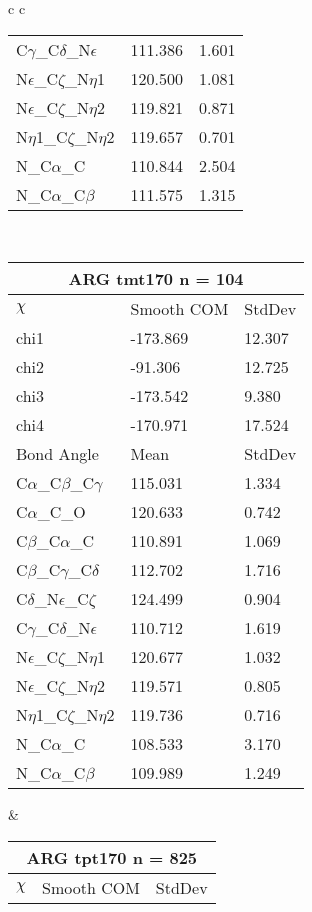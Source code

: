 \begin{longtable}{ c c }
\begin{tabular}{ l l l }
  C$\gamma$\_C$\delta$\_N$\epsilon$ & 111.386 & 1.601\\
  N$\epsilon$\_C$\zeta$\_N$\eta$1 & 120.500 & 1.081\\
  N$\epsilon$\_C$\zeta$\_N$\eta$2 & 119.821 & 0.871\\
  N$\eta$1\_C$\zeta$\_N$\eta$2 & 119.657 & 0.701\\
  N\_C$\alpha$\_C & 110.844 & 2.504\\
  N\_C$\alpha$\_C$\beta$ & 111.575 & 1.315\\
  \bottomrule
  \end{tabular}
  \\
  \begin{tabular}{ l l l }
  \toprule
  \multicolumn{3}{c}{ARG \textbf{tmt170} n = 104} \\ \toprule
  $\chi$       & Smooth COM & StdDev \\ \midrule
  chi1 & -173.869 & 12.307 \\ 
  chi2 & -91.306 & 12.725 \\ 
  chi3 & -173.542 & 9.380 \\ 
  chi4 & -170.971 & 17.524 \\ \midrule
  Bond Angle   & Mean     & StdDev \\ \midrule
  C$\alpha$\_C$\beta$\_C$\gamma$ & 115.031 & 1.334\\
  C$\alpha$\_C\_O & 120.633 & 0.742\\
  C$\beta$\_C$\alpha$\_C & 110.891 & 1.069\\
  C$\beta$\_C$\gamma$\_C$\delta$ & 112.702 & 1.716\\
  C$\delta$\_N$\epsilon$\_C$\zeta$ & 124.499 & 0.904\\
  C$\gamma$\_C$\delta$\_N$\epsilon$ & 110.712 & 1.619\\
  N$\epsilon$\_C$\zeta$\_N$\eta$1 & 120.677 & 1.032\\
  N$\epsilon$\_C$\zeta$\_N$\eta$2 & 119.571 & 0.805\\
  N$\eta$1\_C$\zeta$\_N$\eta$2 & 119.736 & 0.716\\
  N\_C$\alpha$\_C & 108.533 & 3.170\\
  N\_C$\alpha$\_C$\beta$ & 109.989 & 1.249\\
  \bottomrule
  \end{tabular}
  &
  \begin{tabular}{ l l l }
  \toprule
  \multicolumn{3}{c}{ARG \textbf{tpt170} n = 825} \\ \toprule
  $\chi$       & Smooth COM & StdDev \\ \midrule

\end{tabular}
\end{longtable}
